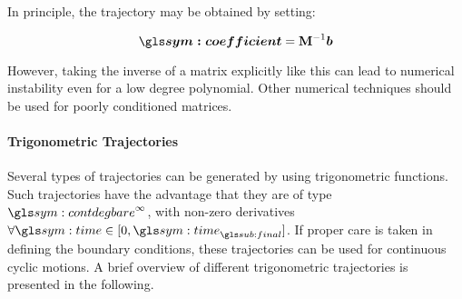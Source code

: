 				In principle, the trajectory may be obtained by setting:

				\begin{equation}
					\vec{\coefficient} = {\mat{M}}^{-1}\vec{b}
				\end{equation}

				However, taking the inverse of a matrix explicitly like this can
				lead to numerical instability even for a low degree polynomial.
				Other numerical techniques should be used for poorly conditioned
				matrices.


			\paragraph{Trigonometric Trajectories}%
			\label{trigonometric_trajectories}

				Several types of trajectories can be generated by using
				trigonometric functions. Such trajectories have the advantage
				that they are of type
				\(
					\contdeg{\infty}
				\), with non-zero derivatives
				\(
					\forall \timesym \in [0, \timesym_{\final}]
				\).
				If proper care is taken in defining the boundary conditions,
				these trajectories can be used for continuous cyclic motions. A
				brief overview of different trigonometric trajectories is
				presented in the following.

